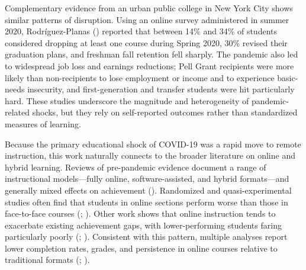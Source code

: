 \documentclass[
  12pt,
  letterpaper,
  DIV=11,
  numbers=noendperiod]{scrartcl}
\begin{document}
Complementary evidence from an urban public college in New York City
shows similar patterns of disruption. Using an online survey
administered in summer 2020, Rodríguez-Planas
() reported that
between 14\% and 34\% of students considered dropping at least one
course during Spring 2020, 30\% revised their graduation plans, and
freshman fall retention fell sharply. The pandemic also led to
widespread job loss and earnings reductions; Pell Grant recipients were
more likely than non-recipients to lose employment or income and to
experience basic-needs insecurity, and first-generation and transfer
students were hit particularly hard. These studies underscore the
magnitude and heterogeneity of pandemic-related shocks, but they rely on
self-reported outcomes rather than standardized measures of learning.

Because the primary educational shock of COVID-19 was a rapid move to
remote instruction, this work naturally connects to the broader
literature on online and hybrid learning. Reviews of pre-pandemic
evidence document a range of instructional models---fully online,
software-assisted, and hybrid formats---and generally mixed effects on
achievement (). Randomized and quasi-experimental studies often find that
students in online sections perform worse than those in face-to-face
courses (;
).
Other work shows that online instruction tends to exacerbate existing
achievement gaps, with lower-performing students faring particularly
poorly (;
). Consistent
with this pattern, multiple analyses report lower completion rates,
grades, and persistence in online courses relative to traditional
formats (;
).
\end{document}
